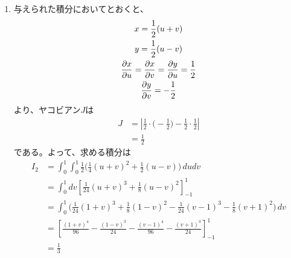 \begin{ans*}
\begin{enumerate}[label=(\alph*)]
    \item 与えられた積分においてとおくと、
    \begin{gather}
      x = \frac{1}{2}(u+v) \\
      y = \frac{1}{2}(u-v) \\
      \frac{\partial x}{\partial u} = \frac{\partial x}{\partial v} = \frac{\partial y}{\partial u} = \frac{1}{2} \\
      \frac{\partial y}{\partial v} = -\frac{1}{2}
    \end{gather}
    より、ヤコビアン$J$は
    \begin{align}
      J
      &= \left|\frac{1}{2}\cdot\biggl(-\frac{1}{2}\biggr) - \frac{1}{2}\cdot\frac{1}{2}\right| \\
      &= \frac{1}{2}
    \end{align}
    である。よって、求める積分は
    \begin{align}
      I_2
      &= \int_{0}^{1}\int_{0}^{1}\frac{1}{2} \biggl(
        \frac{1}{4}(u+v)^2 + \frac{1}{2}(u-v)
      \biggr)\,dudv\\
      &= \int_{0}^{1}dv\left[\frac{1}{24}(u+v)^3 + \frac{1}{8}(u-v)^2\right]_{-1}^{1} \\
      &= \int_{0}^{1}
        \biggl(\frac{1}{24}(1+v)^3 + \frac{1}{8}(1-v)^2 - \frac{1}{24}(v-1)^3 - \frac{1}{8}(v+1)^2\biggr)
      \,dv \\
      &= \left[\frac{(1+v)^4}{96} - \frac{(1-v)^3}{24} - \frac{(v-1)^4}{96} - \frac{(v+1)^3}{24}\right]_{-1}^{1} \\
      &= \frac{1}{3}
    \end{align}
  \end{enumerate}
\end{ans*}




